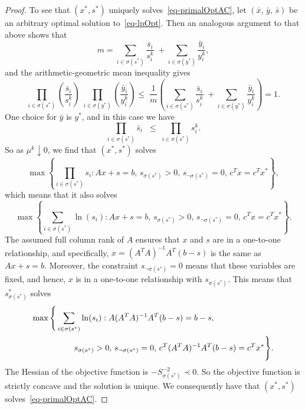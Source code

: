 \documentclass{article}
\def\nd{\prec}
\def\xb{\bar{x}}
\def\yb{\bar{y}}
\def\sb{\bar{s}}
\begin{document}
\begin{proof}
To see that $(x^*, s^*)$ uniquely solves~\eqref{eq-primalOptAC}, let
$(\xb, \, \yb, \, \sb)$ be an arbitrary optimal solution 
to~\eqref{eq-lpOpt}. Then an analogous argument to that above shows 
that
\[
m = \sum_{i \in \sigma(s^*)} \frac{\sb_i}{s^k_i} 
    \; + \sum_{i \in \sigma(y^*)} \frac{\yb_i}{y^k_i},
\]
and the arithmetic-geometric mean inequality gives
\[
\prod_{i \in \sigma(s^*)} \left( \frac{\sb_i}{s^k_i} \right)
    \; \prod_{i \in \sigma(y^*)} \left( \frac{\yb_i}{y^k_i} \right)
\le \; \frac{1}{m} \left(
    \sum_{i \in \sigma(s^*)} \frac{\sb_i}{s^k_i} 
    \; + \sum_{i \in \sigma(y^*)} \frac{\yb_i}{y^k_i} \right) = 1.
\]
One choice for $\yb$ is $y^*$, and in this case we have
\[
\prod_{i \in \sigma(s^*)} \sb_i \;\; \le \; \prod_{i \in \sigma(s^*)} s^k_i.
\]
So as $\mu^k \downarrow 0$, we find that $(x^*, s^*)$ solves
\[
\max \left\{ \prod_{i \in \sigma(s^*)} \!s_i :
        Ax + s = b, \, s_{\sigma(s^*)} > 0, \, s_{\neg\sigma(s^*)} = 0, \, 
        c^T x = c^T x^* \right\},
\]
which means that it also solves
\[
\max \left\{ \sum_{i \in \sigma(s^*)} \ln(s_i) :
        Ax + s = b, \, s_{\sigma(s^*)} > 0, \, s_{\neg\sigma(s^*)} = 0, \, 
        c^T x = c^T x^* \right\}.
\]
The assumed full column rank of $A$ ensures that $x$ and $s$ are in a 
one-to-one relationship, and specifically, $x = (A^TA)^{-1}A^T(b-s)$
is the same as $Ax + s = b$. Moreover, the constraint 
$s_{\neg\sigma(s^*)} = 0$ means that these variables are fixed, 
and hence, $x$ is in a one-to-one relationship with $s_{\sigma(s^*)}$. 
This means that $s^*_{\sigma(s^*)}$ solves
\begin{eqnarray*}
\lefteqn{
\max \Bigg\{ \sum_{i \in \sigma(s^*)} \ln(s_i) : 
    A(A^TA)^{-1}A^T(b-s) = b-s, } \\
& & \hspace*{40pt} s_{\sigma(s^*)} > 0, \, s_{\neg\sigma(s^*)} = 0, \, 
    c^T (A^TA)^{-1}A^T(b-s) = c^T x^* \Bigg\}.
\end{eqnarray*}
The  Hessian of the objective function is $-S_{\sigma(s^*)}^{-2} \nd 0$.
So the objective function is strictly concave and the solution is unique.
We consequently have that $(x^*, s^*)$ solves~\eqref{eq-primalOptAC}.


\end{proof}
\end{document}
